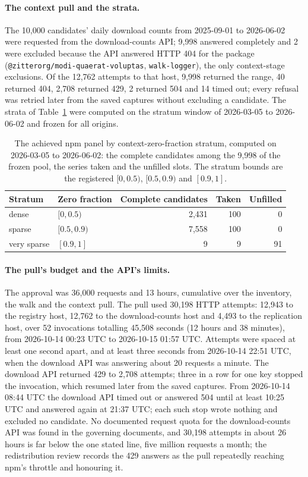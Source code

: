 \paragraph{The context pull and the strata.} The 10,000 candidates' daily download counts from 2025-09-01 to
2026-06-02 were requested from the download-counts API; 9,998 answered completely and 2 were excluded
because the API answered HTTP 404 for the package (\texttt{@zitterorg/modi-quaerat-voluptas},
\texttt{walk-logger}), the only context-stage exclusions. Of the 12,762 attempts to that host, 9,998 returned
the range, 40 returned 404, 2,708 returned 429, 2 returned 504 and 14 timed out; every refusal was retried
later from the saved captures without excluding a candidate. The strata of Table~\ref{tab:s2panel} were
computed on the stratum window of 2026-03-05 to 2026-06-02 and frozen for all origins.

\begin{table}[htbp]
\centering\small
\caption{The achieved npm panel by context-zero-fraction stratum, computed on 2026-03-05 to 2026-06-02:
the complete candidates among the 9,998 of the frozen pool, the series taken and the unfilled slots. The
stratum bounds are the registered $[0, 0.5)$, $[0.5, 0.9)$ and $[0.9, 1]$.}
\label{tab:s2panel}
\begin{tabular}{llrrr}
\toprule
Stratum & Zero fraction & Complete candidates & Taken & Unfilled \\
\midrule
dense & $[0, 0.5)$ & 2,431 & 100 & 0 \\
sparse & $[0.5, 0.9)$ & 7,558 & 100 & 0 \\
very sparse & $[0.9, 1]$ & 9 & 9 & 91 \\
\bottomrule
\end{tabular}
\end{table}

\paragraph{The pull's budget and the API's limits.} The approval was 36,000 requests and 13 hours,
cumulative over the inventory, the walk and the context pull. The pull used 30,198 HTTP attempts: 12,943 to
the registry host, 12,762 to the download-counts host and 4,493 to the replication host, over 52
invocations totalling 45,508 seconds (12 hours and 38 minutes), from 2026-10-14 00:23 UTC to 2026-10-15 01:57
UTC. Attempts were spaced at least one second apart, and at least three seconds from 2026-10-14 22:51 UTC,
when the download API was answering about 20 requests a minute. The download API returned 429 to 2,708
attempts; three in a row for one key stopped the invocation, which resumed later from the saved captures.
From 2026-10-14 08:44 UTC the download API timed out or answered 504 until at least 10:25 UTC and answered
again at 21:37 UTC; each such stop wrote nothing and excluded no candidate. No documented request quota for
the download-counts API was found in the governing documents, and 30,198 attempts in about 26 hours is far
below the one stated line, five million requests a month; the redistribution review records the 429 answers
as the pull repeatedly reaching npm's throttle and honouring it.

